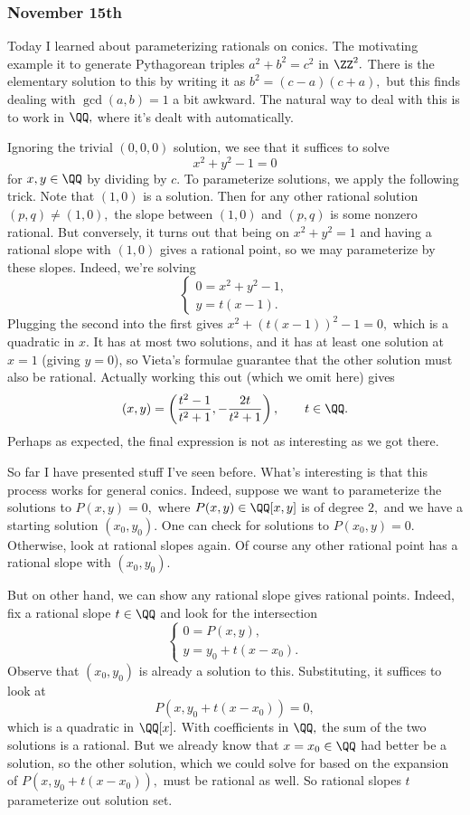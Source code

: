 \subsubsection{November 15th}
Today I learned about parameterizing rationals on conics. The motivating example it to generate Pythagorean triples $a^2+b^2=c^2$ in $\ZZ^2.$ There is the elementary solution to this by writing it as $b^2=(c-a)(c+a),$ but this finds dealing with $\gcd(a,b)=1$ a bit awkward. The natural way to deal with this is to work in $\QQ,$ where it's dealt with automatically.

Ignoring the trivial $(0,0,0)$ solution, we see that it suffices to solve
\[x^2+y^2-1=0\]
for $x,y\in\QQ$ by dividing by $c.$ To parameterize solutions, we apply the following trick. Note that $(1,0)$ is a solution. Then for any other rational solution $(p,q)\ne(1,0),$ the slope between $(1,0)$ and $(p,q)$ is some nonzero rational. But conversely, it turns out that being on $x^2+y^2=1$ and having a rational slope with $(1,0)$ gives a rational point, so we may parameterize by these slopes. Indeed, we're solving
\[\begin{cases}
    0=x^2+y^2-1, \\
    y=t(x-1).
\end{cases}\]
Plugging the second into the first gives $x^2+(t(x-1))^2-1=0,$ which is a quadratic in $x.$ It has at most two solutions, and it has at least one solution at $x=1$ (giving $y=0$), so Vieta's formulae guarantee that the other solution must also be rational. Actually working this out (which we omit here) gives
\[(x,y)=\left(\frac{t^2-1}{t^2+1},-\frac{2t}{t^2+1}\right),\qquad t\in\QQ.\]
Perhaps as expected, the final expression is not as interesting as we got there.

So far I have presented stuff I've seen before. What's interesting is that this process works for general conics. Indeed, suppose we want to parameterize the solutions to $P(x,y)=0,$ where $P(x,y)\in\QQ[x,y]$ is of degree $2,$ and we have a starting solution $(x_0,y_0).$ One can check for solutions to $P(x_0,y)=0.$ Otherwise, look at rational slopes again. Of course any other rational point has a rational slope with $(x_0,y_0).$

But on other hand, we can show any rational slope gives rational points. Indeed, fix a rational slope $t\in\QQ$ and look for the intersection
\[\begin{cases}
    0=P(x,y), \\
    y=y_0+t(x-x_0).
\end{cases}\]
Observe that $(x_0,y_0)$ is already a solution to this. Substituting, it suffices to look at
\[P(x,y_0+t(x-x_0))=0,\]
which is a quadratic in $\QQ[x].$ With coefficients in $\QQ,$ the sum of the two solutions is a rational. But we already know that $x=x_0\in\QQ$ had better be a solution, so the other solution, which we could solve for based on the expansion of $P(x,y_0+t(x-x_0)),$ must be rational as well. So rational slopes $t$ parameterize out solution set.

